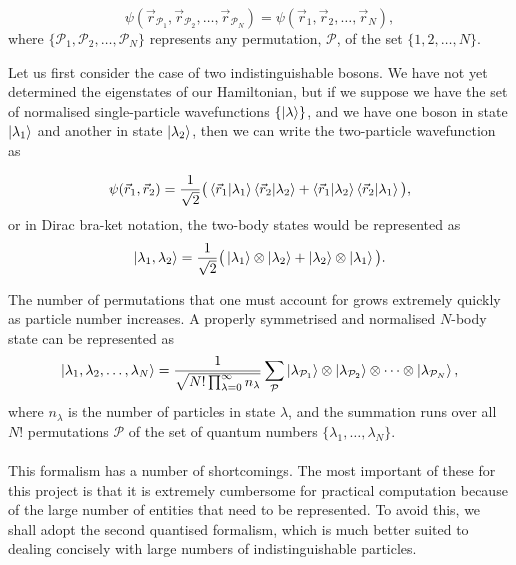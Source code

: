\documentclass[a4paper,10pt]{article}
\begin{document}
\begin{equation*}
 \psi({\vec{r}_{\mathcal{P}_1},\vec{r}_{\mathcal{P}_2},\dots,\vec{r}_{\mathcal{P}_N}})= \psi(\vec{r}_{1},\vec{r}_{2},\dots,\vec{r}_{N}),
\end{equation*}
where $\{\mathcal{P}_1,\mathcal{P}_2,\dots,\mathcal{P}_N  \}$ represents any permutation, $\mathcal{P}$, of the set $\{1,2,\dots,N\}$.

Let us first consider the case of two indistinguishable bosons. We have not yet determined the eigenstates 
of our Hamiltonian, but if we suppose we have the set of normalised single-particle wavefunctions $\{\ket{\lambda}\}$, and we have one boson in state $\ket{\lambda_1}$ and another
in state $\ket{\lambda_2}$, then we can write the two-particle wavefunction as

\begin{equation}
 \psi(\vec{r}_{1},\vec{r}_{2})=\frac{1}{\sqrt{2}}\big(\braket{\vec{r}_{1}|\lambda_1}\braket{\vec{r}_{2}|\lambda_2}+\braket{\vec{r}_{1}|\lambda_2}\braket{\vec{r}_{2}|\lambda_1}\big),
\end{equation}
or in Dirac bra-ket notation, the two-body states would be represented as
\begin{equation}
 \ket{\lambda_1,\lambda_2}=\frac{1}{\sqrt{2}}\big(\ket{\lambda_1}\otimes \ket{\lambda_2}+\ket{\lambda_2}\otimes\ket{\lambda_1}\big).
\end{equation}

The number of permutations that one must account for grows extremely quickly as particle number increases. A properly symmetrised and normalised $N$-body state can be
represented as \cite{Altland2010}
\begin{equation}
 \ket{\lambda_1,\lambda_2,\dots,\lambda_N}=\frac{1}{\sqrt{N!\prod_{\lambda=0}^{\infty}{n_{\lambda}}}}
 \sum_{\mathcal{P}}\ket{\lambda_{\mathcal{P}_1}}\otimes \ket{\lambda_{\mathcal{P}_2}}\otimes\dots\otimes\ket{\lambda_{\mathcal{P}_N}},
\end{equation}
where $n_{\lambda}$ is the number of particles in state $\lambda$, and the summation runs over all $N!$ permutations $\mathcal{P}$ of the set of quantum numbers $\{ \lambda_1,\dots,\lambda_N\}$.
\\\\
This formalism has a number of shortcomings. The most important of these for this project is that it is extremely cumbersome for practical computation because of the large number of entities that need to be 
represented. To avoid this, we shall adopt the second quantised formalism, which is much better suited to dealing concisely with large numbers of indistinguishable particles.
\newpage
\end{document}
